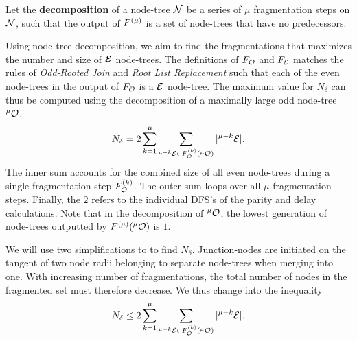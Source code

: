 \begin{definition}\label{def:decomposition}
  Let the \textbf{decomposition} of a node-tree $\mathcal{N}$ be a series of $\mu$ fragmentation steps on $\mathcal{N}$, such that the output of $F^{(\mu)}$ is a set of node-trees that have no predecessors. 
\end{definition}

Using node-tree decomposition, we aim to find the fragmentations that maximizes the number and size of $\bm{\mathcal{E}}$ node-trees. The definitions of $F_{\mathcal{O}}$ and $F_{\mathcal{E}}$ matches the rules of \emph{Odd-Rooted Join} and \emph{Root List Replacement} such that each of the even node-trees in the output of $F_{\mathcal{O}}$ is a $\bm{\mathcal{E}}$ node-tree. The maximum value for $N_\delta$ can thus be computed using the decomposition of a maximally large odd node-tree ${}^{\mu}\mathcal{O}$. 
\begin{equation}\label{eq:npdc}
  N_\delta = 2\sum_{k=1}^\mu{ \sum_{  {}^{\mu-k} \mathcal{E}\in F_{\mathcal{O}}^{(k)}( {}^{\mu} \mathcal{O}) }{ \lvert {}^{\mu-k} \mathcal{E}\rvert} }.
\end{equation}
The inner sum accounts for the combined size of all even node-trees during a single fragmentation step $F_{\mathcal{O}}^{(k)}$. The outer sum loops over all $\mu$ fragmentation steps. Finally, the $2$ refers to the individual DFS's of the parity and delay calculations. Note that in the decomposition of ${}^{\mu}\mathcal{O}$, the lowest generation of node-trees outputted by $F^{(\mu)}({}^{\mu}\mathcal{O})$ is $1$. 


We will use two simplifications to  to find $N_\delta$. Junction-nodes are initiated on the tangent of two node radii belonging to separate node-trees when merging into one. With increasing number of fragmentations, the total number of nodes in the fragmented set must therefore decrease. We thus change  into the inequality
\begin{equation}\label{eq:npdc2}
  N_\delta \leq 2\sum_{k=1}^\mu{ \sum_{  {}^{\mu-k} \mathcal{E}\in F_{\mathcal{O}}^{(k)}( {}^{\mu} \mathcal{O}) }{ \lvert {}^{\mu-k} \mathcal{E}\rvert}}. 
\end{equation}

